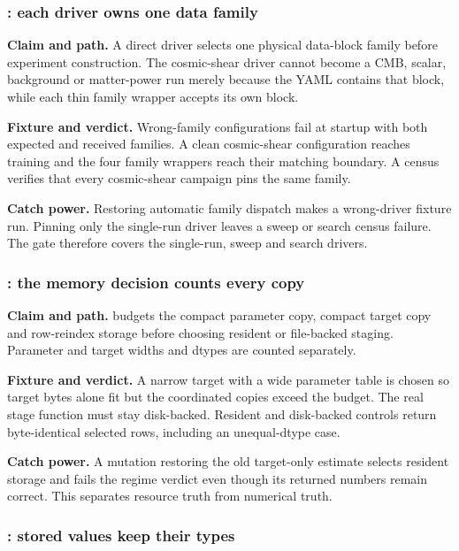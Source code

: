 \subsubsection{: each driver owns one data family}

\textbf{Claim and path.}  A direct driver selects one physical data-block
family before experiment construction.  The cosmic-shear driver cannot
become a CMB, scalar, background or matter-power run merely because the YAML
contains that block, while each thin family wrapper accepts its own block.

\textbf{Fixture and verdict.}  Wrong-family configurations fail at startup
with both expected and received families.  A clean cosmic-shear configuration
reaches training and the four family wrappers reach their matching boundary.
A census verifies that every cosmic-shear campaign pins the same family.

\textbf{Catch power.}  Restoring automatic family dispatch makes a
wrong-driver fixture run.  Pinning only the single-run driver leaves a sweep
or search census failure.  The gate therefore covers the single-run, sweep
and search drivers.

\subsubsection{: the memory decision counts every copy}

\textbf{Claim and path.}   budgets the compact parameter
copy, compact target copy and row-reindex storage before choosing resident or
file-backed staging.  Parameter and target widths and dtypes are counted
separately.

\textbf{Fixture and verdict.}  A narrow target with a wide parameter table is
chosen so target bytes alone fit but the coordinated copies exceed the
budget.  The real stage function must stay disk-backed.  Resident and
disk-backed controls return byte-identical selected rows, including an
unequal-dtype case.

\textbf{Catch power.}  A mutation restoring the old target-only estimate
selects resident storage and fails the regime verdict even though its returned
numbers remain correct.  This separates resource truth from numerical truth.

\subsubsection{: stored values keep their types}

